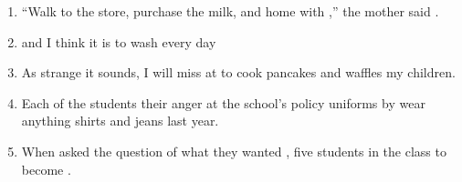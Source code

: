 \begin{spacing}{1.5}
\begin{enumerate}
\item \begin{inparaenum}[A]
``Walk  to the store, purchase the milk, and  home with ,'' the mother said  . 
\end{inparaenum}

\vfill
\item \begin{inparaenum}[A]
 and  I think it is  to wash  every day 
\end{inparaenum}

\vfill
\item \begin{inparaenum}[A]
As strange  it sounds, I will miss  at  to cook pancakes and waffles  my children. 
\end{inparaenum}

\vfill
\item \begin{inparaenum}[A]
Each of the students  their anger at the school's policy  uniforms by  wear anything  shirts and jeans last year. 
\end{inparaenum}

\vfill
\item \begin{inparaenum}[A]
When asked the question of what  they wanted , five students in the class  to become . 
\end{inparaenum}


\end{enumerate}
\end{spacing}
